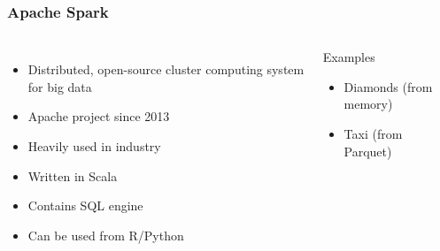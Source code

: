 \begin{frame}
	\frametitle{Apache Spark}
	\begin{columns}
		\begin{itemize}
			\item Distributed, open-source cluster computing system for big data
			\item Apache project since 2013
			\item Heavily used in industry
			\item Written in Scala
			\item Contains SQL engine
			\item Can be used from R/Python
		\end{itemize}
		
		\vfill
		
		
		\begin{exampleblock}{Examples}
			\begin{itemize}
				\item Diamonds (from memory)
				\item Taxi (from Parquet)
			\end{itemize}
		\end{exampleblock}
	\end{columns}
\end{frame}
